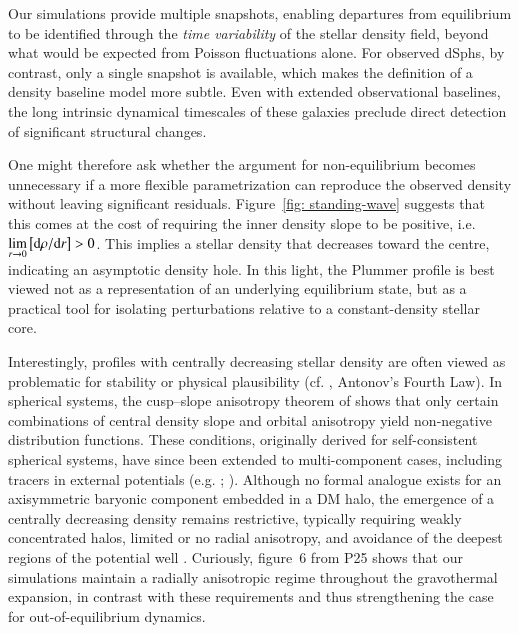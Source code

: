\documentclass[fleqn,usenatbib]{mnras}
\newcommand{\diff}{{\rm d}}
\begin{document}
Our simulations provide multiple snapshots, enabling departures from equilibrium to be identified through the \textit{time variability} of the stellar density field, beyond what would be expected from Poisson fluctuations alone. For observed dSphs, by contrast, only a single snapshot is available, which makes the definition of a density baseline model more subtle. Even with extended observational baselines, the long intrinsic dynamical timescales of these galaxies preclude direct detection of significant structural changes.

One might therefore ask whether the argument for non-equilibrium becomes unnecessary if a more flexible parametrization can reproduce the observed density without leaving significant residuals. Figure~\ref{fig: standing-wave} suggests that this comes at the cost of requiring the inner density slope to be positive, i.e.
$\displaystyle \lim_{r \to 0} \left[ \diff \rho / \diff r \right] > 0$.
This implies a stellar density that decreases toward the centre, indicating an asymptotic density hole. In this light, the Plummer profile is best viewed not as a representation of an underlying equilibrium state, but as a practical tool for isolating perturbations relative to a constant-density stellar core.

Interestingly, profiles with centrally decreasing stellar density are often viewed as problematic for stability or physical plausibility (cf. \citealt{Binney&Tremaine87}, Antonov’s Fourth Law). In spherical systems, the cusp–slope anisotropy theorem of \citet{An&Evans06} shows that only certain combinations of central density slope and orbital anisotropy yield non-negative distribution functions. These conditions, originally derived for self-consistent spherical systems, have since been extended to multi-component cases, including tracers in external potentials (e.g. \citealt{Ciotti&Morganti09, Ciotti&Morganti10a, Ciotti&Morganti10b}; \citealt*{VanHese+11}). Although no formal analogue exists for an axisymmetric baryonic component embedded in a DM halo, the emergence of a centrally decreasing density remains restrictive, typically requiring weakly concentrated halos, limited or no radial anisotropy, and avoidance of the deepest regions of the potential well \citep[see][specifically]{Ciotti&Morganti09}. Curiously, figure~6 from P25 shows that our simulations maintain a radially anisotropic regime throughout the gravothermal expansion, in contrast with these requirements and thus strengthening the case for out-of-equilibrium dynamics.
\end{document}
